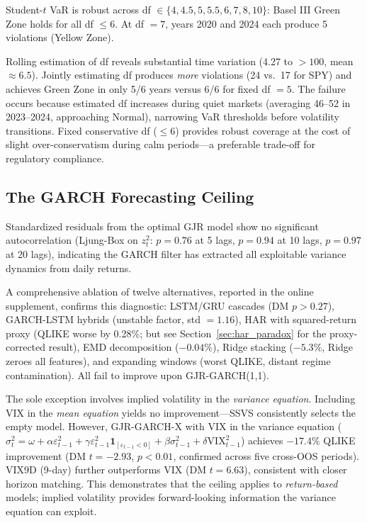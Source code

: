 Student-$t$ VaR is robust across df $\in \{4, 4.5, 5, 5.5, 6, 7, 8, 10\}$: Basel III Green Zone holds for all df $\leq 6$. At df $= 7$, years 2020 and 2024 each produce 5 violations (Yellow Zone).

Rolling estimation of df reveals substantial time variation (4.27 to $>100$, mean $\approx 6.5$). Jointly estimating df produces \textit{more} violations (24 vs.\ 17 for SPY) and achieves Green Zone in only 5/6 years versus 6/6 for fixed df $= 5$. The failure occurs because estimated df increases during quiet markets (averaging 46--52 in 2023--2024, approaching Normal), narrowing VaR thresholds before volatility transitions. Fixed conservative df ($\leq 6$) provides robust coverage at the cost of slight over-conservatism during calm periods---a preferable trade-off for regulatory compliance.

\subsection{The GARCH Forecasting Ceiling}

Standardized residuals from the optimal GJR model show no significant autocorrelation (Ljung-Box on $z^2_t$: $p = 0.76$ at 5 lags, $p = 0.94$ at 10 lags, $p = 0.97$ at 20 lags), indicating the GARCH filter has extracted all exploitable variance dynamics from daily returns.

A comprehensive ablation of twelve alternatives, reported in the online supplement, confirms this diagnostic: LSTM/GRU cascades (DM $p > 0.27$), GARCH-LSTM hybrids (unstable factor, std $= 1.16$), HAR with squared-return proxy (QLIKE worse by 0.28\%; but see Section~\ref{sec:har_paradox} for the proxy-corrected result), EMD decomposition ($-0.04\%$), Ridge stacking ($-5.3\%$, Ridge zeroes all features), and expanding windows (worst QLIKE, distant regime contamination). All fail to improve upon GJR-GARCH(1,1).

The sole exception involves implied volatility in the \textit{variance equation}. Including VIX in the \textit{mean equation} yields no improvement---SSVS consistently selects the empty model. However, GJR-GARCH-X with VIX in the variance equation ($\sigma^2_t = \omega + \alpha \varepsilon^2_{t-1} + \gamma \varepsilon^2_{t-1} \mathbf{1}_{[\varepsilon_{t-1}<0]} + \beta \sigma^2_{t-1} + \delta \text{VIX}^2_{t-1}$) achieves $-17.4\%$ QLIKE improvement (DM $t = -2.93$, $p < 0.01$, confirmed across five cross-OOS periods). VIX9D (9-day) further outperforms VIX (DM $t = 6.63$), consistent with closer horizon matching. This demonstrates that the ceiling applies to \textit{return-based} models; implied volatility provides forward-looking information the variance equation can exploit.

